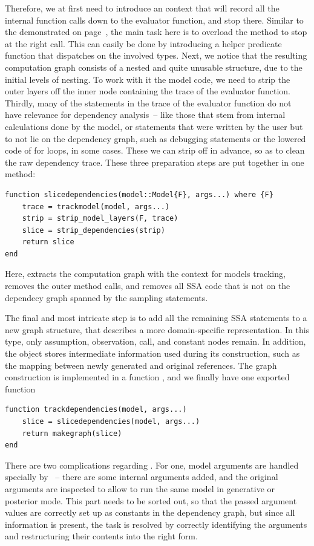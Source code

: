 Therefore, we at first need to introduce an \irtrackerjl{} context that will record all the internal
function calls down to the evaluator function, and stop there.  Similar to the
 demonstrated on page~\pageref{lst:depthlimitcontext}, the main task here
is to overload the  method to stop at the right call.  This can easily be done by
introducing a helper predicate function  that dispatches on the involved types.
Next, we notice that the resulting computation graph consists of a nested and quite unusable
structure, due to the initial levels of nesting.  To work with it the model code, we need to strip
the outer layers off the inner node containing the trace of the evaluator function.  Thirdly, many
of the statements in the trace of the evaluator function do not have relevance for dependency
analysis~-- like those that stem from internal calculations done by the model, or statements that
were written by the user but to not lie on the dependency graph, such as debugging statements or the
lowered code of for loops, in some cases.  These we can strip off in advance, so as to clean the raw
dependency trace.  These three preparation steps are put together in one method:
\begin{lstlisting}
function slicedependencies(model::Model{F}, args...) where {F}
    trace = trackmodel(model, args...)
    strip = strip_model_layers(F, trace)
    slice = strip_dependencies(strip)
    return slice
end
\end{lstlisting}
Here,  extracts the computation graph with the context for models tracking,
 removes the outer method calls, and  removes
all SSA code that is not on the dependecy graph spanned by the sampling statements.

The final and most intricate step is to add all the remaining SSA statements to a new graph
structure, that describes a more domain-specific representation.  In this  type, only
assumption, observation, call, and constant nodes remain.  In addition, the object stores
intermediate information used during its construction, such as the mapping between newly generated
and original references.  The graph construction is implemented in a function , and
we finally have one exported function
\begin{lstlisting}
function trackdependencies(model, args...)
    slice = slicedependencies(model, args...)
    return makegraph(slice)
end
\end{lstlisting}
There are two complications regarding .  For one, model arguments are handled
specially by \dppljl{}~-- there are some internal arguments added, and the original arguments are
inspected to allow to run the same model in generative or posterior mode.  This part needs to be
sorted out, so that the passed argument values are correctly set up as constants in the dependency
graph, but since all information is present, the task is resolved by correctly identifying the
arguments and restructuring their contents into the right form.

